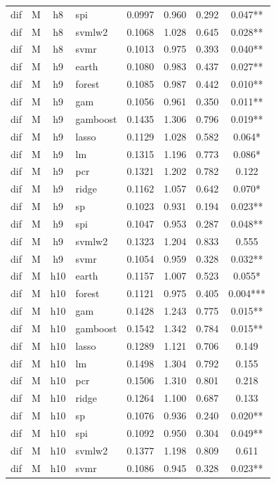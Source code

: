 \begin{ThreePartTable}
\begin{longtable}[t]{llclcccc}
dif & M & h8 & spi & 0.0997 & 0.960 & 0.292 & 0.047**\\
dif & M & h8 & svmlw2 & 0.1068 & 1.028 & 0.645 & 0.028**\\
dif & M & h8 & svmr & 0.1013 & 0.975 & 0.393 & 0.040**\\
\addlinespace
dif & M & h9 & earth & 0.1080 & 0.983 & 0.437 & 0.027**\\
dif & M & h9 & forest & 0.1085 & 0.987 & 0.442 & 0.010**\\
dif & M & h9 & gam & 0.1056 & 0.961 & 0.350 & 0.011**\\
dif & M & h9 & gamboost & 0.1435 & 1.306 & 0.796 & 0.019**\\
dif & M & h9 & lasso & 0.1129 & 1.028 & 0.582 & 0.064*\\
dif & M & h9 & lm & 0.1315 & 1.196 & 0.773 & 0.086*\\
dif & M & h9 & pcr & 0.1321 & 1.202 & 0.782 & 0.122\\
dif & M & h9 & ridge & 0.1162 & 1.057 & 0.642 & 0.070*\\
dif & M & h9 & sp & 0.1023 & 0.931 & 0.194 & 0.023**\\
dif & M & h9 & spi & 0.1047 & 0.953 & 0.287 & 0.048**\\
dif & M & h9 & svmlw2 & 0.1323 & 1.204 & 0.833 & 0.555\\
dif & M & h9 & svmr & 0.1054 & 0.959 & 0.328 & 0.032**\\
\addlinespace
dif & M & h10 & earth & 0.1157 & 1.007 & 0.523 & 0.055*\\
dif & M & h10 & forest & 0.1121 & 0.975 & 0.405 & 0.004***\\
dif & M & h10 & gam & 0.1428 & 1.243 & 0.775 & 0.015**\\
dif & M & h10 & gamboost & 0.1542 & 1.342 & 0.784 & 0.015**\\
dif & M & h10 & lasso & 0.1289 & 1.121 & 0.706 & 0.149\\
dif & M & h10 & lm & 0.1498 & 1.304 & 0.792 & 0.155\\
dif & M & h10 & pcr & 0.1506 & 1.310 & 0.801 & 0.218\\
dif & M & h10 & ridge & 0.1264 & 1.100 & 0.687 & 0.133\\
dif & M & h10 & sp & 0.1076 & 0.936 & 0.240 & 0.020**\\
dif & M & h10 & spi & 0.1092 & 0.950 & 0.304 & 0.049**\\
dif & M & h10 & svmlw2 & 0.1377 & 1.198 & 0.809 & 0.611\\
dif & M & h10 & svmr & 0.1086 & 0.945 & 0.328 & 0.023**\\

\end{longtable}
\end{ThreePartTable}

